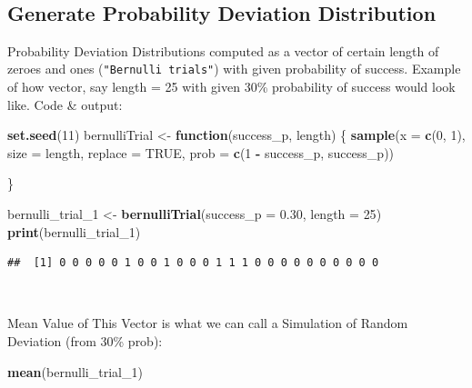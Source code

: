 \documentclass[]{article}
\newenvironment{Shaded}{\begin{snugshade}}{\end{snugshade}}
\newcommand{\ControlFlowTok}[1]{\textcolor[rgb]{0.13,0.29,0.53}{\textbf{#1}}}
\newcommand{\DataTypeTok}[1]{\textcolor[rgb]{0.13,0.29,0.53}{#1}}
\newcommand{\DecValTok}[1]{\textcolor[rgb]{0.00,0.00,0.81}{#1}}
\newcommand{\FloatTok}[1]{\textcolor[rgb]{0.00,0.00,0.81}{#1}}
\newcommand{\KeywordTok}[1]{\textcolor[rgb]{0.13,0.29,0.53}{\textbf{#1}}}
\newcommand{\NormalTok}[1]{#1}
\newcommand{\OperatorTok}[1]{\textcolor[rgb]{0.81,0.36,0.00}{\textbf{#1}}}
\newcommand{\OtherTok}[1]{\textcolor[rgb]{0.56,0.35,0.01}{#1}}
\newcommand{\StringTok}[1]{\textcolor[rgb]{0.31,0.60,0.02}{#1}}
\begin{document}
~

\hypertarget{generate-probability-deviation-distribution}{%
\subsection{Generate Probability Deviation
Distribution}\label{generate-probability-deviation-distribution}}

Probability Deviation Distributions computed as a vector of certain
length of zeroes and ones (\texttt{"Bernulli\ trials"}) with given
probability of success. Example of how vector, say length = 25 with
given 30\% probability of success would look like. Code \& output:

\begin{Shaded}
\begin{Highlighting}[]
\KeywordTok{set.seed}\NormalTok{(}\DecValTok{11}\NormalTok{)}
\NormalTok{bernulliTrial <-}\StringTok{ }\ControlFlowTok{function}\NormalTok{(success_p, length) \{}
        \KeywordTok{sample}\NormalTok{(}\DataTypeTok{x       =} \KeywordTok{c}\NormalTok{(}\DecValTok{0}\NormalTok{, }\DecValTok{1}\NormalTok{),}
               \DataTypeTok{size    =}\NormalTok{ length,}
               \DataTypeTok{replace =} \OtherTok{TRUE}\NormalTok{,}
               \DataTypeTok{prob    =} \KeywordTok{c}\NormalTok{(}\DecValTok{1} \OperatorTok{-}\StringTok{ }\NormalTok{success_p, success_p))}
        
\NormalTok{\}}

\NormalTok{bernulli_trial_}\DecValTok{1}\NormalTok{ <-}\StringTok{ }\KeywordTok{bernulliTrial}\NormalTok{(}\DataTypeTok{success_p =} \FloatTok{0.30}\NormalTok{, }\DataTypeTok{length =} \DecValTok{25}\NormalTok{)}
\KeywordTok{print}\NormalTok{(bernulli_trial_}\DecValTok{1}\NormalTok{)}
\end{Highlighting}
\end{Shaded}

\begin{verbatim}
##  [1] 0 0 0 0 0 1 0 0 1 0 0 0 1 1 1 0 0 0 0 0 0 0 0 0 0
\end{verbatim}

~

Mean Value of This Vector is what we can call a Simulation of Random
Deviation (from 30\% prob):

\begin{Shaded}
\begin{Highlighting}[]
\KeywordTok{mean}\NormalTok{(bernulli_trial_}\DecValTok{1}\NormalTok{)}
\end{Highlighting}
\end{Shaded}
\end{document}
